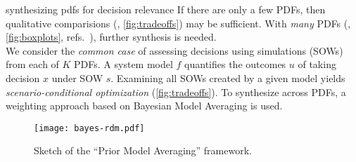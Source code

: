 \begin{block}{synthesizing pdfs for decision relevance}
    If there are only a few PDFs, then qualitative comparisions (\eg, \cref{fig:tradeoffs}) may be sufficient.
    With \emph{many} PDFs (\eg, \cref{fig:boxplots}, refs.~\cite{ruckert_coastal:2019,sharma_rcp:2021}), further synthesis is needed.\\[0.5em]
    We consider the \emph{common case} of assessing decisions using simulations (SOWs) from each of $K$ PDFs.
    A system model $f$ quantifies the outcomes $u$ of taking decision $x$ under SOW $s$.
    Examining all SOWs created by a given model yields \emph{scenario-conditional optimization} (\cref{fig:tradeoffs}).
    To synthesize across PDFs, a weighting approach based on Bayesian Model Averaging \cite{wong_surge:2018,Yao:2018bu} is used.
    \begin{figure}
        \centering
        \texttt{[image: bayes-rdm.pdf]}
        \caption{
            Sketch of the ``Prior Model Averaging'' framework.
        }\label{fig:flowchart}
    \end{figure}
\end{block}
